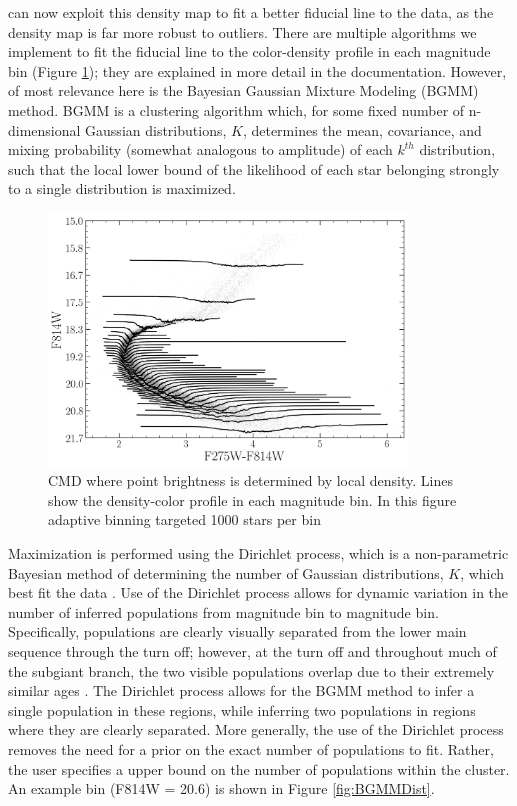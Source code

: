 \fidanka can now exploit this density map to fit a better fiducial line to the
data, as the density map is far more robust to outliers. There are multiple
algorithms we implement to fit the fiducial line to the color-density profile
in each magnitude bin (Figure \ref{densityBinsDemo}); they are explained in
more detail in the \fidanka documentation. However, of most relevance here is
the Bayesian Gaussian Mixture Modeling (BGMM) method. BGMM is a clustering
algorithm which, for some fixed number of n-dimensional Gaussian distributions,
$K$, determines the mean, covariance, and mixing probability (somewhat
analogous to amplitude) of each $k^{th}$ distribution, such that the local
lower bound of the likelihood of each star belonging strongly to a single
distribution is maximized. 

\begin{figure}
	\centering
	\includegraphics[width=0.85\textwidth]{figures/ngc2808/notebookFigures/DensityBinsDemo.png}
	\caption{CMD where point brightness is determined by local density. Lines show the
	density-color profile in each magnitude bin. In this figure adaptive
	binning targeted 1000 stars per bin}
	\label{densityBinsDemo}
\end{figure}

Maximization is performed using the Dirichlet process, which is a
non-parametric Bayesian method of determining the number of Gaussian
distributions, $K$, which best fit the data \citep{Ferguson1973, scikit-learn}.
Use of the Dirichlet process allows for dynamic variation in the number of
inferred populations from magnitude bin to magnitude bin. Specifically,
populations are clearly visually separated from the lower main sequence through
the turn off; however, at the turn off and throughout much of the subgiant
branch, the two visible populations overlap due to their extremely similar ages
\citep[i.e.][]{Jordan2002}. The Dirichlet process allows for the BGMM method to
infer a single population in these regions, while inferring two populations in
regions where they are clearly separated. More generally, the use of the
Dirichlet process removes the need for a prior on the exact number of
populations to fit. Rather, the user specifies a upper bound on the number of
populations within the cluster. An example bin (F814W = 20.6) is shown in
Figure \ref{fig:BGMMDist}.

